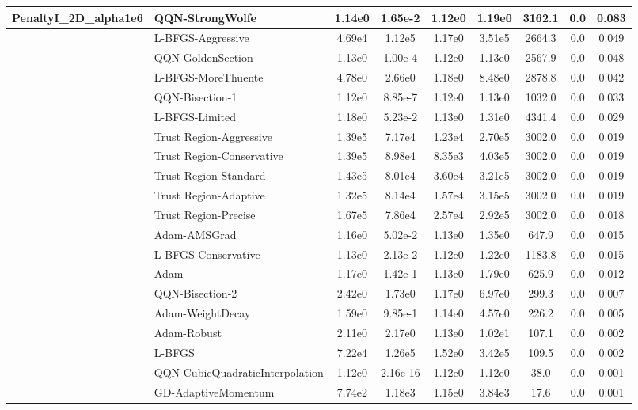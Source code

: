 \documentclass{article}
\begin{document}
\begin{longtable}{|l|l|c|c|c|c|c|c|c|}
PenaltyI\_2D\_alpha1e6 & \textbf{QQN-StrongWolfe} & 1.14e0 & 1.65e-2 & 1.12e0 & 1.19e0 & 3162.1 & 0.0 & 0.083 \\
\hline
 & L-BFGS-Aggressive & 4.69e4 & 1.12e5 & 1.17e0 & 3.51e5 & 2664.3 & 0.0 & 0.049 \\
\hline
 & QQN-GoldenSection & 1.13e0 & 1.00e-4 & 1.12e0 & 1.13e0 & 2567.9 & 0.0 & 0.048 \\
\hline
 & L-BFGS-MoreThuente & 4.78e0 & 2.66e0 & 1.18e0 & 8.48e0 & 2878.8 & 0.0 & 0.042 \\
\hline
 & QQN-Bisection-1 & 1.12e0 & 8.85e-7 & 1.12e0 & 1.13e0 & 1032.0 & 0.0 & 0.033 \\
\hline
 & L-BFGS-Limited & 1.18e0 & 5.23e-2 & 1.13e0 & 1.31e0 & 4341.4 & 0.0 & 0.029 \\
\hline
 & Trust Region-Aggressive & 1.39e5 & 7.17e4 & 1.23e4 & 2.70e5 & 3002.0 & 0.0 & 0.019 \\
\hline
 & Trust Region-Conservative & 1.39e5 & 8.98e4 & 8.35e3 & 4.03e5 & 3002.0 & 0.0 & 0.019 \\
\hline
 & Trust Region-Standard & 1.43e5 & 8.01e4 & 3.60e4 & 3.21e5 & 3002.0 & 0.0 & 0.019 \\
\hline
 & Trust Region-Adaptive & 1.32e5 & 8.14e4 & 1.57e4 & 3.15e5 & 3002.0 & 0.0 & 0.019 \\
\hline
 & Trust Region-Precise & 1.67e5 & 7.86e4 & 2.57e4 & 2.92e5 & 3002.0 & 0.0 & 0.018 \\
\hline
 & Adam-AMSGrad & 1.16e0 & 5.02e-2 & 1.13e0 & 1.35e0 & 647.9 & 0.0 & 0.015 \\
\hline
 & L-BFGS-Conservative & 1.13e0 & 2.13e-2 & 1.12e0 & 1.22e0 & 1183.8 & 0.0 & 0.015 \\
\hline
 & Adam & 1.17e0 & 1.42e-1 & 1.13e0 & 1.79e0 & 625.9 & 0.0 & 0.012 \\
\hline
 & QQN-Bisection-2 & 2.42e0 & 1.73e0 & 1.17e0 & 6.97e0 & 299.3 & 0.0 & 0.007 \\
\hline
 & Adam-WeightDecay & 1.59e0 & 9.85e-1 & 1.14e0 & 4.57e0 & 226.2 & 0.0 & 0.005 \\
\hline
 & Adam-Robust & 2.11e0 & 2.17e0 & 1.13e0 & 1.02e1 & 107.1 & 0.0 & 0.002 \\
\hline
 & L-BFGS & 7.22e4 & 1.26e5 & 1.52e0 & 3.42e5 & 109.5 & 0.0 & 0.002 \\
\hline
 & QQN-CubicQuadraticInterpolation & 1.12e0 & 2.16e-16 & 1.12e0 & 1.12e0 & 38.0 & 0.0 & 0.001 \\
\hline
 & GD-AdaptiveMomentum & 7.74e2 & 1.18e3 & 1.15e0 & 3.84e3 & 17.6 & 0.0 & 0.001 \\

\end{longtable}
\end{document}
